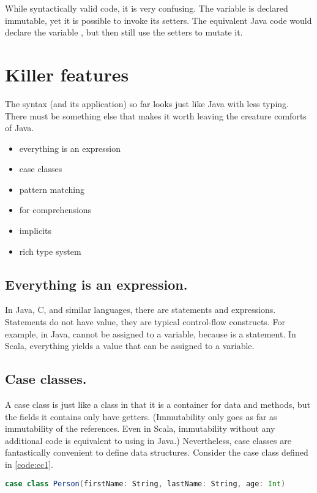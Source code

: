 \documentclass[10 pt]{article}
\begin{document}
While syntactically valid code, it is very confusing. The  variable is declared immutable, yet it is possible to invoke its setters. The equivalent Java code would declare the  variable , but then still use the setters to mutate it.

\section{Killer features}
The syntax (and its application) so far looks just like Java with less typing. There must be something else that makes it worth leaving the creature comforts of Java. 

\begin{itemize}
  \item everything is an expression
  \item case classes
  \item pattern matching
  \item for comprehensions
  \item implicits
  \item rich type system
\end{itemize}

\subsection{Everything is an expression.} 
In Java, C, and similar languages, there are statements and expressions. Statements do not have value, they are typical control-flow constructs. For example, in Java,  cannot be assigned to a variable, because  is a statement. In Scala, everything yields a value that can be assigned to a variable. 

\subsection{Case classes.} A case class is just like a class in that it is a container for data and methods, but the fields it contains only have getters. (Immutability only goes as far as immutability of the references. Even in Scala, immutability without any additional code is equivalent to using  in Java.) Nevertheless, case classes are fantastically convenient to define data structures. Consider the  case class defined in \autoref{code:cc1}.

\begin{lstlisting}[caption={Case class \pcode{Person}}, label={code:cc1}, language=Scala, escapechar=|]
case class Person(firstName: String, lastName: String, age: Int)
\end{lstlisting}
\end{document}
